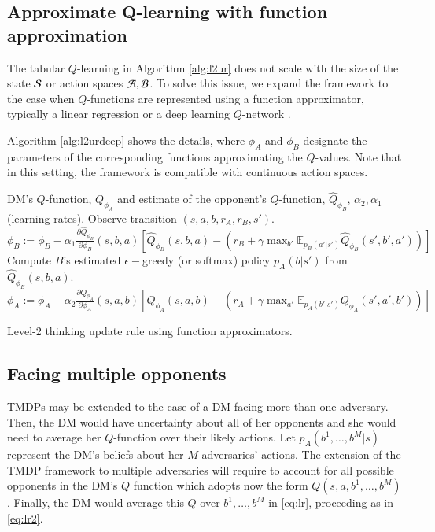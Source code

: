 \subsection{Approximate Q-learning with function approximation}\label{sec:approx_rl}

The tabular $Q$-learning in Algorithm \ref{alg:l2ur} does not scale with the size of the state ${\cal S}$ or action spaces
${\cal A, B}$.
To solve this issue, we expand the framework to the case when  $Q$-functions are represented using a function approximator, typically a linear regression or
a deep learning $Q$-network \parencite{mnih2015human}. 

Algorithm \ref{alg:l2urdeep} shows the details, where $\phi_A$ and $\phi_B$ designate the parameters of the corresponding functions approximating the $Q$-values. Note that in this setting,
the framework is compatible with continuous action spaces.

\begin{algorithm*}[!ht]
\begin{algorithmic}[1]
\Require DM's $Q$-function, $Q_{\phi_A}$ and estimate of the opponent's $Q$-function, $\hat{Q}_{\phi_B}$, $\alpha_2, \alpha_1$ (learning rates).
\State Observe  transition $(s, a, b, r_A, r_B, s')$.
\State $\phi_B := \phi_B - \alpha_1 \frac{\partial \hat{Q}_{\phi_B}}{\partial \phi_B}(s, b,a)\left[ \hat{Q}_{\phi_B}(s,b,a) - (r_B + \gamma \max_{b'}\mathbb{E}_{p_B(a'|s')} \hat{Q}_{\phi_B} (s', b',a') ) \right]  $
\State Compute $B$'s estimated $\epsilon-$greedy (or softmax) policy $p_A(b|s')$ from $\hat{Q}_{\phi_B}(s,b,a)$.
\State $\phi_A := \phi_A - \alpha_2 \frac{\partial Q_{\phi_A}}{\partial \phi_A}(s, a,b) \left[ Q_{\phi_A}(s,a,b) - (r_A + \gamma \max_{a'}\mathbb{E}_{p_A(b'|s')} Q_{\phi_A} (s', a',b') ) \right]  $ 
\end{algorithmic}
\caption{Level-2 thinking update rule using function approximators.}
\label{alg:l2urdeep}
\end{algorithm*}

\subsection{Facing multiple opponents}\label{sec:mul}
%
TMDPs may be extended to the case of a DM facing more than one adversary. Then, the DM would have uncertainty about all of her opponents and she would need to average her $Q$-function over their
likely actions. Let $p_A(b^1, \dots, b^M \vert s)$ represent the DM's beliefs about her $M$ adversaries' actions. The extension of the TMDP framework to multiple adversaries will require to account for all possible opponents in the DM's $Q$ function which adopts now the form $Q(s,a,b^1,\dots,b^M)$. Finally, the DM would average this $Q$ over $b^1, \dots, b^M$ in \eqref{eq:lr}, proceeding as in \eqref{eq:lr2}.


